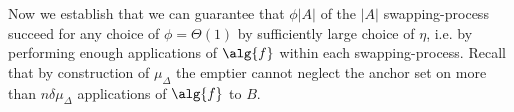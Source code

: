{  %



  Now we establish that we can guarantee that $\phi |A|$ of the
  $|A|$ swapping-process succeed for any choice of $\phi =
  \Theta(1)$ by sufficiently large choice of $\eta$, i.e. by performing
  enough applications of $\alg{f}$ within each swapping-process.
  Recall that by construction of $\mu_\Delta$ the emptier cannot
  neglect the anchor set on more than $n\delta \mu_\Delta$
  applications of $\alg{f}$ to $B$. 

}

